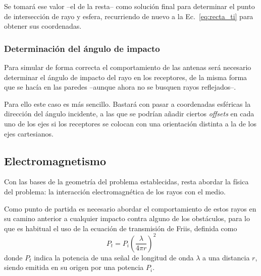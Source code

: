Se tomará ese valor --el de la resta-- como solución final para determinar el punto de intersección de rayo y esfera, recurriendo de nuevo a la Ec.~\eqref{eq:recta_ti} para obtener sus coordenadas.

\subsubsection*{Determinación del ángulo de impacto}

Para simular de forma correcta el comportamiento de las antenas será necesario determinar el ángulo de impacto del rayo en los receptores, de la misma forma que se hacía en las paredes --aunque ahora no se busquen rayos reflejados--.

Para ello este caso es más sencillo.
Bastará con pasar a coordenadas esféricas la dirección del ángulo incidente, a las que se podrían añadir ciertos \textit{offsets} en cada uno de los ejes si los receptores se colocan con una orientación distinta a la de los ejes cartesianos.




\subsection{Electromagnetismo}

Con las bases de la geometría del problema establecidas, resta abordar la física del problema: la interacción electromagnética de los rayos con el medio.

Como punto de partida es necesario abordar el comportamiento de estos rayos en su camino anterior a cualquier impacto contra alguno de los obstáculos, para lo que es habitual el uso de la ecuación de transmisión de Friis, definida como\cite{Antennas}
\begin{equation}
    \label{eq:Friis}
    P_t = P_i \left( \frac{\lambda}{4\pi r} \right)^2
\end{equation}
donde $P_t$ indica la potencia de una señal de longitud de onda $\lambda$ a una distancia $r$, siendo emitida en su origen por una potencia $P_i$.

